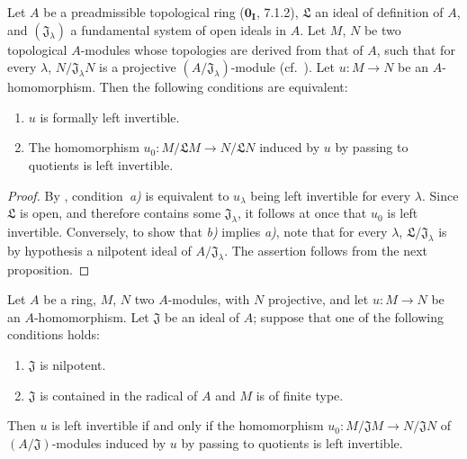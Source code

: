 \begin{proposition}[19.1.9]
\label{0.19.1.9}
Let $A$ be a \textup{preadmissible} topological ring \textup{($\mathbf{0_I}$, 7.1.2)}, $\mathfrak L$ an ideal of definition of $A$, and $(\mathfrak J_\lambda)$ a fundamental system of open ideals in $A$.
Let $M$, $N$ be two topological $A$-modules whose topologies are derived from that of $A$, such that for every $\lambda$, $N/\mathfrak J_\lambda N$ is a projective $(A/\mathfrak J_\lambda)$-module (cf.~).
Let $u:M\to N$ be an $A$-homomorphism.
Then the following conditions are equivalent:
\begin{enumerate}
  \item[\textup{a)}] $u$ is formally left invertible.


  \item[\textup{b)}] The homomorphism $u_0:M/\mathfrak LM\to N/\mathfrak LN$ induced by $u$ by passing to quotients is left invertible.
\end{enumerate}
\end{proposition}

\begin{proof}
By , condition~\emph{a)} is equivalent to $u_\lambda$ being left invertible for every $\lambda$.
Since $\mathfrak L$ is open, and therefore contains some $\mathfrak J_\lambda$, it follows at once that $u_0$ is left invertible.
Conversely, to show that \emph{b)} implies \emph{a)}, note that for every $\lambda$, $\mathfrak L/\mathfrak J_\lambda$ is by hypothesis a nilpotent ideal of $A/\mathfrak J_\lambda$.
The assertion follows from the next proposition.
\end{proof}

\begin{proposition}[19.1.10]
\label{0.19.1.10}
Let $A$ be a ring, $M$, $N$ two $A$-modules, with $N$ projective, and let $u:M\to N$ be an $A$-homomorphism.
Let $\mathfrak J$ be an ideal of $A$;
suppose that \textup{one} of the following conditions holds:
\begin{enumerate}
  \item[\textup{(i)}] $\mathfrak J$ is nilpotent.
  \item[\textup{(ii)}] $\mathfrak J$ is contained in the radical of $A$ and $M$ is of finite type.
\end{enumerate}
Then $u$ is left invertible if and only if the homomorphism
$u_0:M/\mathfrak JM\to N/\mathfrak JN$ of $(A/\mathfrak J)$-modules induced by $u$ by passing to quotients is left invertible.
\end{proposition}

